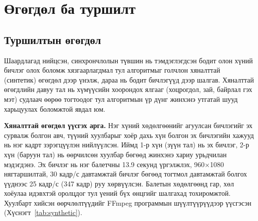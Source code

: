 \chapter{Өгөгдөл ба туршилт}
\section{Туршилтын өгөгдөл}

Шаардлагад нийцсэн, синхрончлолын түвшин нь тэмдэглэгдсэн бодит олон хүний бичлэг олох боломж хязгаарлагдмал тул алгоритмыг голчлон хяналттай (синтетик) өгөгдөл дээр үнэлж, дараа нь бодит бичлэгүүд дээр шалгав. Хяналттай өгөгдлийн давуу тал нь хүмүүсийн хоорондох ялгааг (хоцрогдол, зай, байрлал гэх мэт) судлаач өөрөө тогтоодог тул алгоритмын үр дүнг жинхэнэ утгатай шууд харьцуулах боломжтой явдал юм.

\textbf{Хяналттай өгөгдөл үүсгэх арга.} Нэг хүний хөдөлгөөнийг агуулсан бичлэгийг эх сурвалж болгон авч, түүний хуулбарыг хоёр дахь хүн болгон эх бичлэгийн хажууд нь нэг кадрт зэрэгцүүлэн нийлүүлсэн. Иймд 1-р хүн (зүүн тал) нь эх бичлэг, 2-р хүн (баруун тал) нь өөрчилсөн хуулбар бөгөөд жинхэнэ хариу урьдчилан мэдэгдэнэ. Эх бичлэг нь нэг балетчны 13.9 секунд үргэлжлэх, 960×1080 нягтаршилтай, 30 кадр/с давтамжтай бичлэг бөгөөд тогтмол давтамжтай болгох үүднээс 25 кадр/с (347 кадр) руу хөрвүүлсэн. Балетын хөдөлгөөнд гар, хөл хоёулаа идэвхтэй оролцдог тул үений бүх өнцгийг шалгахад тохиромжтой. Хуулбарт хийсэн өөрчлөлтүүдийг FFmpeg программын шүүлтүүрүүдээр үүсгэсэн (Хүснэгт~\ref{tab:synthetic}).

